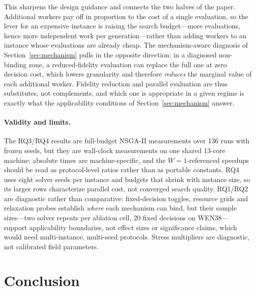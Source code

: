 \documentclass[10pt,conference,letterpaper]{IEEEtran}
\begin{document}
\begin{table}[t]
\centering
\caption{Scale ladder: population 32, eight solver seeds,
$W\in\{1,2,4,8\}$; means $\pm$ s.d.\ over seeds. Within every (instance,
seed) block all worker counts yield identical fronts.}
\label{tab:scaling}
\small
\setlength{\tabcolsep}{4pt}

\end{table}

This sharpens the design guidance and connects the two halves of the
paper. Additional workers pay off in proportion to the cost of a single
evaluation, so the lever for an expensive instance is raising the search
budget---more evaluations, hence more independent work per
generation---rather than adding workers to an instance whose evaluations
are already cheap. The mechanism-aware diagnosis of
Section~\ref{sec:mechanism} pulls in the opposite direction: in a
diagnosed non-binding zone, a reduced-fidelity evaluation can replace the
full one at zero decision cost, which lowers granularity and therefore
\emph{reduces} the marginal value of each additional worker. Fidelity
reduction and parallel evaluation are thus substitutes, not complements,
and which one is appropriate in a given regime is exactly what the
applicability conditions of Section~\ref{sec:mechanism} answer.

\paragraph{Validity and limits.}
The RQ3/RQ4 results are full-budget NSGA-II measurements over 136 runs
with frozen seeds, but they are wall-clock measurements on one shared
13-core machine; absolute times are machine-specific, and the
$W{=}1$-referenced speedups should be read as protocol-level ratios
rather than as portable constants. RQ4 uses eight solver seeds per
instance and budgets that shrink with instance size, so its larger rows
characterize parallel cost, not converged search quality. RQ1/RQ2 are
diagnostic rather than comparative: fixed-decision toggles, resource
grids and relaxation probes establish \emph{where} each mechanism can
bind, but their sample sizes---two solver repeats per ablation cell, 20
fixed decisions on WEN38---support applicability boundaries, not effect
sizes or significance claims, which would need multi-instance,
multi-seed protocols. Stress multipliers are diagnostic, not calibrated
field parameters.

\section{Conclusion}
\label{sec:conclusion}
\end{document}
